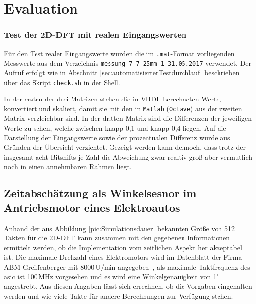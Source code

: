 



  
 \chapter{Evaluation}
 





 \subsection{Test der 2D-DFT mit realen Eingangswerten}
 
 Für den Test realer Eingangswerte wurden die im \texttt{.mat}-Format vorliegenden Messwerte aus dem Verzeichnis \texttt{messung\_7\_7\_25mm\_1\_31.05.2017} verwendet.
 Der Aufruf erfolgt wie in Abschnitt \ref{sec:automatisierterTestdurchlauf} beschrieben über das Skript \texttt{check.sh} in der Shell.
 
 
 

In der ersten der drei Matrizen stehen die in VHDL berechneten Werte, konvertiert und skaliert, damit sie mit den in \texttt{Matlab} (\texttt{Octave}) aus der zweiten 
Matrix vergleichbar sind. In der dritten Matrix sind die Differenzen der jeweiligen Werte zu sehen, welche zwischen knapp 0,1 und knapp 0,4 liegen. 
Auf die Darstellung der Eingangswerte sowie der prozentualen Differenz wurde aus Gründen der Übersicht verzichtet. 
Gezeigt werden kann dennoch, dass trotz der insgesamt acht Bitshifts je Zahl die Abweichung zwar realtiv groß aber vermutlich noch in einen annehmbaren Rahmen liegt.
 
 
 \section{Zeitabschätzung als Winkelsesnor im Antriebsmotor eines Elektroautos}
 Anhand der aus Abbildung \ref{pic:Simulationsdauer} bekannten Größe von 512 Takten für die 2D-DFT kann zusammen mit den gegebenen Informationen
 ermittelt werden, ob die Implementation vom zeitlichen 
 Aspekt her akzeptabel ist.
 Die maximale Drehzahl eines Elektromotors wird im Datenblatt der Firma ABM Greiffenberger mit 8000\,U/min angegeben~\autocite[5]{greiffenberger},
 als maximale Taktfrequenz des \gls{asic} ist 100\,MHz vorgesehen und es wird eine Winkelgenauigkeit von 1${}^\circ$ angestrebt.
 Aus diesen Angaben lässt sich errechnen, ob die Vorgaben eingehalten werden und wie viele Takte für andere Berechnungen zur Verfügung stehen.
 
